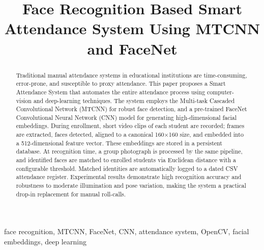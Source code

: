 \documentclass[conference]{IEEEtran}
\begin{document}
\title{Face Recognition Based Smart Attendance System Using MTCNN and FaceNet}

\author{
\and
{}
}

\maketitle

\begin{abstract}
Traditional manual attendance systems in educational institutions are
time-consuming, error-prone, and susceptible to proxy attendance. This
paper proposes a Smart Attendance System that automates the entire
attendance process using computer-vision and deep-learning techniques.
The system employs the Multi-task Cascaded Convolutional Network (MTCNN)
for robust face detection, and a pre-trained FaceNet Convolutional Neural
Network (CNN) model for generating high-dimensional facial embeddings.
During enrollment, short video clips of each student are recorded; frames
are extracted, faces detected, aligned to a canonical 160$\times$160 size,
and embedded into a 512-dimensional feature vector. These embeddings are
stored in a persistent database. At recognition time, a group photograph
is processed by the same pipeline, and identified faces are matched to
enrolled students via Euclidean distance with a configurable threshold.
Matched identities are automatically logged to a dated CSV attendance
register. Experimental results demonstrate high recognition accuracy and
robustness to moderate illumination and pose variation, making the system
a practical drop-in replacement for manual roll-calls.
\end{abstract}

\begin{IEEEkeywords}
face recognition, MTCNN, FaceNet, CNN, attendance system, OpenCV,
facial embeddings, deep learning
\end{IEEEkeywords}
\end{document}
